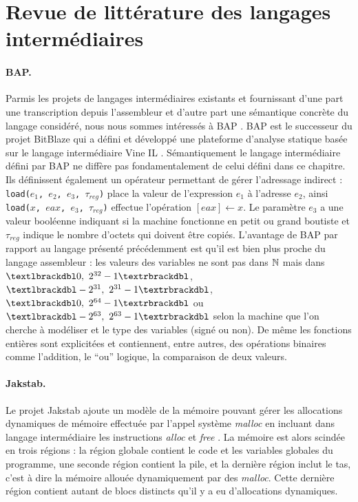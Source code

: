 \section{Revue de littérature des langages intermédiaires}

\paragraph{BAP.} Parmis les projets de langages intermédiaires existants et fournissant d'une part une transcription depuis l'assembleur et d'autre part une sémantique concrète du langage considéré, nous nous sommes intéressés à BAP \cite{BAP11}. 
BAP est le successeur du projet BitBlaze qui a défini et développé une plateforme d'analyse statique basée sur le langage intermédiaire Vine IL \cite{bitblaze08}. 
Sémantiquement le langage intermédiaire défini par BAP ne diffère pas fondamentalement de celui défini dans ce chapitre. 
Ils définissent également un opérateur permettant de gérer l'adressage indirect : \texttt{load($e_1$, $e_2$, $e_3$, $\tau_{reg}$)} place la valeur de l'expression $e_1$ à l'adresse $e_2$, ainsi \texttt{load($x$, $eax$, $e_3$, $\tau_{reg}$)} effectue l'opération \texttt{$[eax]\leftarrow x$}. 
Le paramètre $e_3$ a une valeur booléenne indiquant si la machine fonctionne en petit ou grand boutiste et $\tau_{reg}$ indique le nombre d'octets qui doivent être copiés. 
L'avantage de BAP par rapport au langage présenté précédemment est qu'il est bien plus proche du langage assembleur : les valeurs des variables ne sont pas dans $\mathbb N$ mais dans $\textlbrackdbl 0,\ 2^{32}-1\textrbrackdbl$, $\textlbrackdbl -2^{31},\ 2^{31}-1\textrbrackdbl$, $\textlbrackdbl 0,\ 2^{64}-1\textrbrackdbl$ ou $\textlbrackdbl -2^{63},\ 2^{63}-1\textrbrackdbl$ selon la machine que l'on cherche à modéliser et le type des variables (signé ou non). 
De même les fonctions entières sont explicitées et contiennent, entre autres, des opérations binaires comme l'addition, le ``ou'' logique, la comparaison de deux valeurs.

\paragraph{Jakstab.} Le projet Jakstab \cite{jakstab} ajoute un modèle de la mémoire pouvant gérer les allocations dynamiques de mémoire effectuée par l'appel système \emph{malloc} en incluant dans langage intermédiaire les instructions \emph{alloc} et \emph{free} \cite{jakstab-drivers}. 
La mémoire est alors scindée en trois régions : la région globale contient le code et les variables globales du programme, une seconde région contient la pile, et la dernière région inclut le tas, c'est à dire la mémoire allouée dynamiquement par des \emph{malloc}. 
Cette dernière région contient autant de blocs distincts qu'il y a eu d'allocations dynamiques.

